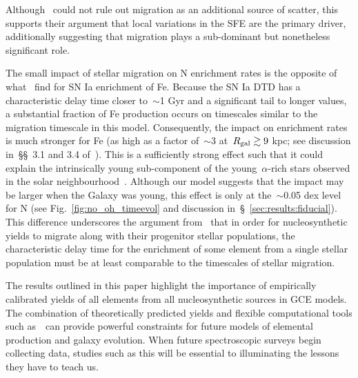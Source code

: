 \documentclass[ms.tex]{subfiles}
\begin{document}
Although~\citet{Schaefer2020} could not rule out migration as an additional
source of scatter, this supports their argument that local variations in the
SFE are the primary driver, additionally suggesting that migration plays a
sub-dominant but nonetheless significant role.
\par
The small impact of stellar migration on N enrichment rates is the opposite of
what~\citet{Johnson2021} find for SN Ia enrichment of Fe.
Because the SN Ia DTD has a characteristic delay time closer to~$\sim$1 Gyr
and a significant tail to longer values, a substantial fraction of Fe
production occurs on timescales similar to the migration timescale in this
model.
Consequently, the impact on enrichment rates is much stronger for Fe (as high
as a factor of~$\sim$3 at~$R_\text{gal} \gtrsim 9$ kpc; see discussion in~\S\S~3.1 and
3.4 of~\citealp{Johnson2021}).
This is a sufficiently strong effect such that it could explain the
intrinsically young sub-component of the young~$\alpha$-rich stars observed in
the solar neighbourhood~\citep{Chiappini2015, Martig2015, Martig2016,
Jofre2016, Yong2016, Izzard2018, SilvaAguirre2018, Warfield2021}.
Although our model suggests that the impact may be larger when the Galaxy was
young, this effect is only at the~$\sim$0.05 dex level for N (see
Fig.~\ref{fig:no_oh_timeevol} and discussion in~\S~\ref{sec:results:fiducial}).
This difference underscores the argument from~\citet{Johnson2021} that in order
for nucleosynthetic yields to migrate along with their progenitor stellar
populations, the characteristic delay time for the enrichment of some element
from a single stellar population must be at least comparable to the timescales
of stellar migration.
\par
The results outlined in this paper highlight the importance of empirically
calibrated yields of all elements from all nucleosynthetic sources in GCE
models.
The combination of theoretically predicted yields and flexible computational
tools such as~\vice~can provide powerful constraints for future models of
elemental production and galaxy evolution.
When future spectroscopic surveys begin collecting data, studies such as this
will be essential to illuminating the lessons they have to teach us.
\end{document}
